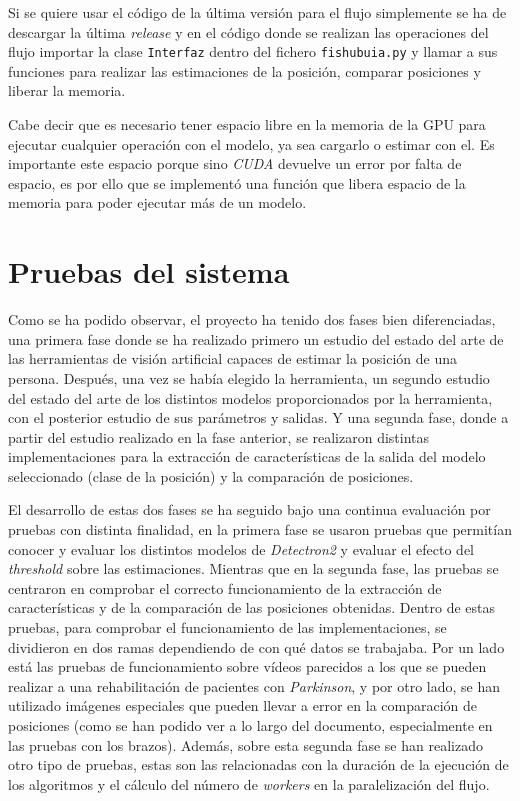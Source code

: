 Si se quiere usar el código de la última versión para el flujo simplemente se ha de descargar la última \textit{release} y en el código donde se realizan las operaciones del flujo importar la clase \texttt{Interfaz} dentro del fichero \texttt{fishubuia.py} y llamar a sus funciones para realizar las estimaciones de la posición, comparar posiciones y liberar la memoria.

Cabe decir que es necesario tener espacio libre en la memoria de la GPU para ejecutar cualquier operación con el modelo, ya sea cargarlo o estimar con el. Es importante este espacio porque sino \textit{CUDA} devuelve un error por falta de espacio, es por ello que se implementó una función que libera espacio de la memoria para poder ejecutar más de un modelo.

\section{Pruebas del sistema}
Como se ha podido observar, el proyecto ha tenido dos fases bien diferenciadas, una primera fase donde se ha realizado primero un estudio del estado del arte de las herramientas de visión artificial capaces de estimar la posición de una persona. Después, una vez se había elegido la herramienta, un segundo estudio del estado del arte de los distintos modelos proporcionados por la herramienta, con el posterior estudio de sus parámetros y salidas. Y una segunda fase, donde a partir del estudio realizado en la fase anterior, se realizaron distintas implementaciones para la extracción de características de la salida del modelo seleccionado (clase de la posición) y la comparación de posiciones.

El desarrollo de estas dos fases se ha seguido bajo una continua evaluación por pruebas con distinta finalidad, en la primera fase se usaron pruebas que permitían conocer y evaluar los distintos modelos de \textit{Detectron2} y evaluar el efecto del \textit{threshold} sobre las estimaciones. Mientras que en la segunda fase, las pruebas se centraron en comprobar el correcto funcionamiento de la extracción de características y de la comparación de las posiciones obtenidas. Dentro de estas pruebas, para comprobar el funcionamiento de las implementaciones, se dividieron en dos ramas dependiendo de con qué datos se trabajaba. Por un lado está las pruebas de funcionamiento sobre vídeos parecidos a los que se pueden realizar a una rehabilitación de pacientes con \textit{Parkinson}, y por otro lado, se han utilizado imágenes especiales que pueden llevar a error en la comparación de posiciones (como se han podido ver a lo largo del documento, especialmente en las pruebas con los brazos). Además, sobre esta segunda fase se han realizado otro tipo de pruebas, estas son las relacionadas con la duración de la ejecución de los algoritmos y el cálculo del número de \textit{workers} en la paralelización del flujo.

